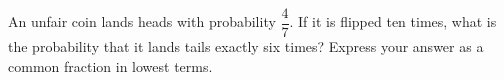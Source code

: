 An unfair coin lands heads with probability $\dfrac{4}{7}$. If it is flipped ten times, what is the probability that it lands tails exactly six times? Express your answer as a common fraction in lowest terms.

